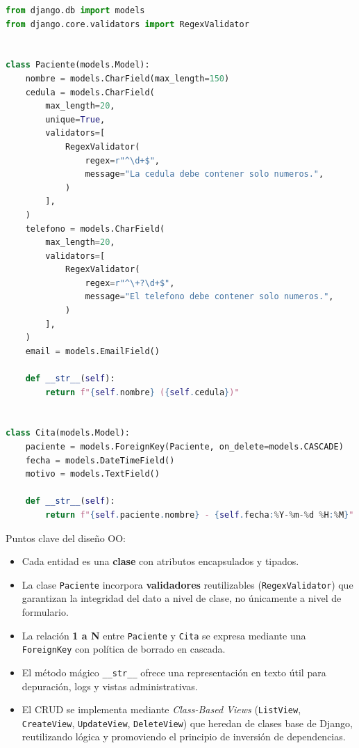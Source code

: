 \documentclass[12pt,a4paper]{article}
\begin{document}
\begin{lstlisting}[language=Python, caption={clinica/models.py}]
from django.db import models
from django.core.validators import RegexValidator


class Paciente(models.Model):
    nombre = models.CharField(max_length=150)
    cedula = models.CharField(
        max_length=20,
        unique=True,
        validators=[
            RegexValidator(
                regex=r"^\d+$",
                message="La cedula debe contener solo numeros.",
            )
        ],
    )
    telefono = models.CharField(
        max_length=20,
        validators=[
            RegexValidator(
                regex=r"^\+?\d+$",
                message="El telefono debe contener solo numeros.",
            )
        ],
    )
    email = models.EmailField()

    def __str__(self):
        return f"{self.nombre} ({self.cedula})"


class Cita(models.Model):
    paciente = models.ForeignKey(Paciente, on_delete=models.CASCADE)
    fecha = models.DateTimeField()
    motivo = models.TextField()

    def __str__(self):
        return f"{self.paciente.nombre} - {self.fecha:%Y-%m-%d %H:%M}"
\end{lstlisting}

Puntos clave del diseño OO:

\begin{itemize}
    \item Cada entidad es una \textbf{clase} con atributos encapsulados y tipados.
    \item La clase \texttt{Paciente} incorpora \textbf{validadores} reutilizables (\texttt{RegexValidator}) que garantizan la integridad del dato a nivel de clase, no únicamente a nivel de formulario.
    \item La relación \textbf{1 a N} entre \texttt{Paciente} y \texttt{Cita} se expresa mediante una \texttt{ForeignKey} con política de borrado en cascada.
    \item El método mágico \texttt{\_\_str\_\_} ofrece una representación en texto útil para depuración, logs y vistas administrativas.
    \item El CRUD se implementa mediante \textit{Class-Based Views} (\texttt{ListView}, \texttt{CreateView}, \texttt{UpdateView}, \texttt{DeleteView}) que heredan de clases base de Django, reutilizando lógica y promoviendo el principio de inversión de dependencias.
\end{itemize}
\end{document}

